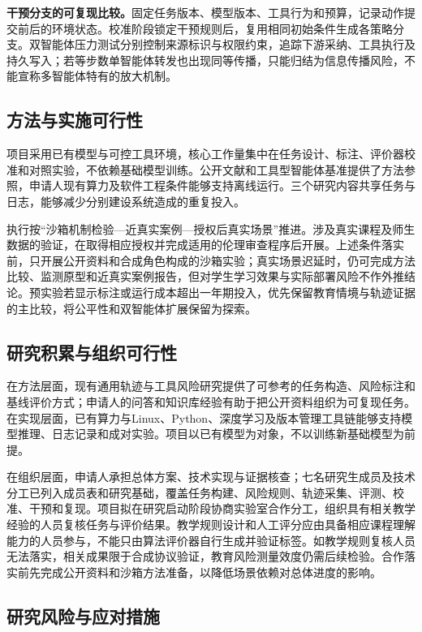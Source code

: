 \textbf{干预分支的可复现比较。}固定任务版本、模型版本、工具行为和预算，记录动作提交前后的环境状态。校准阶段锁定干预规则后，复用相同初始条件生成各策略分支。双智能体压力测试分别控制来源标识与权限约束，追踪下游采纳、工具执行及持久写入；若等步数单智能体转发也出现同等传播，只能归结为信息传播风险，不能宣称多智能体特有的放大机制。

\subsection{方法与实施可行性}

项目采用已有模型与可控工具环境，核心工作量集中在任务设计、标注、评价器校准和对照实验，不依赖基础模型训练。公开文献和工具型智能体基准提供了方法参照，申请人现有算力及软件工程条件能够支持离线运行。三个研究内容共享任务与日志，能够减少分别建设系统造成的重复投入。

执行按“沙箱机制检验—近真实案例—授权后真实场景”推进。涉及真实课程及师生数据的验证，在取得相应授权并完成适用的伦理审查程序后开展。上述条件落实前，只开展公开资料和合成角色构成的沙箱实验；真实场景迟延时，仍可完成方法比较、监测原型和近真实案例报告，但对学生学习效果与实际部署风险不作外推结论。预实验若显示标注或运行成本超出一年期投入，优先保留教育情境与轨迹证据的主比较，将公平性和双智能体扩展保留为探索。

\subsection{研究积累与组织可行性}

在方法层面，现有通用轨迹与工具风险研究提供了可参考的任务构造、风险标注和基线评价方式；申请人的问答和知识库经验有助于把公开资料组织为可复现任务。在实现层面，已有算力与Linux、Python、深度学习及版本管理工具链能够支持模型推理、日志记录和成对实验。项目以已有模型为对象，不以训练新基础模型为前提。

在组织层面，申请人承担总体方案、技术实现与证据核查；七名研究生成员及技术分工已列入成员表和研究基础，覆盖任务构建、风险规则、轨迹采集、评测、校准、干预和复现。项目拟在研究启动阶段协商实验室合作分工，组织具有相关教学经验的人员复核任务与评价结果。教学规则设计和人工评分应由具备相应课程理解能力的人员参与，不能只由算法评价器自行生成并验证标签。如教学规则复核人员无法落实，相关成果限于合成协议验证，教育风险测量效度仍需后续检验。合作落实前先完成公开资料和沙箱方法准备，以降低场景依赖对总体进度的影响。

\subsection{研究风险与应对措施}

